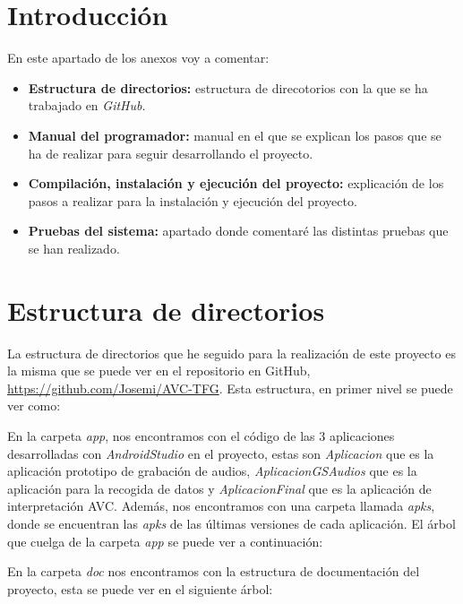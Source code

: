 
\section{Introducción}
En este apartado de los anexos voy a comentar:
\begin{itemize}
	\item \textbf{Estructura de directorios:} estructura de direcotorios con la que se ha trabajado en \textit{GitHub}.
	\item \textbf{Manual del programador:} manual en el que se explican los pasos que se ha de realizar para seguir desarrollando el proyecto.
	\item \textbf{Compilación, instalación y ejecución del proyecto:} explicación de los pasos a realizar para la instalación y ejecución del proyecto.
	\item \textbf{Pruebas del sistema:} apartado donde comentaré las distintas pruebas que se han realizado.
\end{itemize}
\section{Estructura de directorios}
La estructura de directorios que he seguido para la realización de este proyecto es la misma que se puede ver en el repositorio en GitHub, \url{https://github.com/Josemi/AVC-TFG}. Esta estructura, en primer nivel se puede ver como:

En la carpeta \textit{app}, nos encontramos con el código de las 3 aplicaciones desarrolladas con \textit{AndroidStudio} en el proyecto, estas son \textit{Aplicacion} que es la aplicación prototipo de grabación de audios, \textit{AplicacionGSAudios} que es la aplicación para la recogida de datos y \textit{AplicacionFinal} que es la aplicación de interpretación AVC. Además, nos encontramos con una carpeta llamada \textit{apks}, donde se encuentran las \textit{apks} de las últimas versiones de cada aplicación. El árbol que cuelga de la carpeta \textit{app} se puede ver a continuación:


En la carpeta \textit{doc} nos encontramos con la estructura de documentación del proyecto, esta se puede ver en el siguiente árbol:

